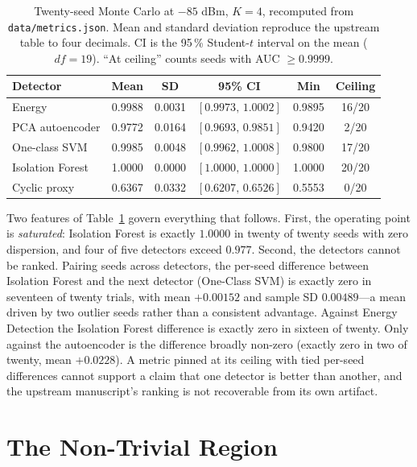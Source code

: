 \documentclass[conference]{IEEEtran}
\newcommand{\Artifact}{\texttt{data/\allowbreak metrics.json}}
\begin{document}
\begin{table}[t]
\centering
\caption{Twenty-seed Monte Carlo at $-85$ dBm, $K=4$, recomputed from \Artifact{}. Mean and standard deviation reproduce the upstream table to four decimals. CI is the 95\,\% Student-$t$ interval on the mean ($df=19$). ``At ceiling'' counts seeds with AUC $\geq 0.9999$.}
\label{tab:mc}
\small
\footnotesize
\setlength{\tabcolsep}{3.2pt}
\begin{tabular}{>{\raggedright\arraybackslash}p{}ccccc}
\toprule
Detector & Mean & SD & 95\% CI & Min & Ceiling \\
\midrule
Energy          & 0.9988 & 0.0031 & $[0.9973,\,1.0002]$ & 0.9895 & 16/20 \\
PCA autoencoder & 0.9772 & 0.0164 & $[0.9693,\,0.9851]$ & 0.9420 & 2/20 \\
One-class SVM   & 0.9985 & 0.0048 & $[0.9962,\,1.0008]$ & 0.9800 & 17/20 \\
Isolation Forest& 1.0000 & 0.0000 & $[1.0000,\,1.0000]$ & 1.0000 & 20/20 \\
Cyclic proxy    & 0.6367 & 0.0332 & $[0.6207,\,0.6526]$ & 0.5553 & 0/20 \\
\bottomrule
\end{tabular}
\end{table}

Two features of Table~\ref{tab:mc} govern everything that follows. First, the operating point is \emph{saturated}: Isolation Forest is exactly $1.0000$ in twenty of twenty seeds with zero dispersion, and four of five detectors exceed $0.977$. Second, the detectors cannot be ranked. Pairing seeds across detectors, the per-seed difference between Isolation Forest and the next detector (One-Class SVM) is exactly zero in seventeen of twenty trials, with mean $+0.00152$ and sample SD $0.00489$---a mean driven by two outlier seeds rather than a consistent advantage. Against Energy Detection the Isolation Forest difference is exactly zero in sixteen of twenty. Only against the autoencoder is the difference broadly non-zero (exactly zero in two of twenty, mean $+0.0228$). A metric pinned at its ceiling with tied per-seed differences cannot support a claim that one detector is better than another, and the upstream manuscript's ranking is not recoverable from its own artifact.

\section{The Non-Trivial Region}
\label{sec:sweep}
\end{document}
